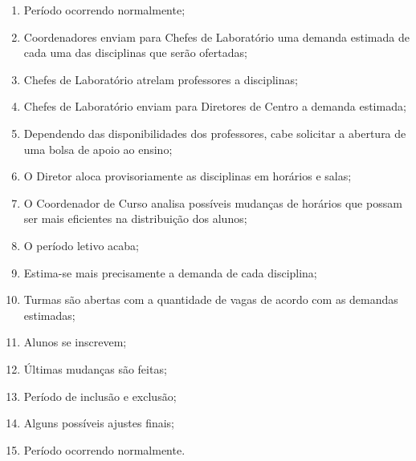     \begin{enumerate}
        \item Período ocorrendo normalmente;
        \item Coordenadores enviam para Chefes de Laboratório uma demanda estimada de cada uma das disciplinas que serão ofertadas;
        \item Chefes de Laboratório atrelam professores a disciplinas;
        \item Chefes de Laboratório enviam para Diretores de Centro a demanda estimada;
        \item Dependendo das disponibilidades dos professores, cabe solicitar a abertura de uma bolsa de apoio ao ensino;
        \item O Diretor aloca provisoriamente as disciplinas em horários e salas;
        \item O Coordenador de Curso analisa possíveis mudanças de horários que possam ser mais eficientes na distribuição dos alunos;
        \item O período letivo acaba;
        \item Estima-se mais precisamente a demanda de cada disciplina;
        \item Turmas são abertas com a quantidade de vagas de acordo com as demandas estimadas;
        \item Alunos se inscrevem;
        \item Últimas mudanças são feitas;
        \item Período de inclusão e exclusão;
        \item Alguns possíveis ajustes finais;
        \item Período ocorrendo normalmente.
    \end{enumerate}


